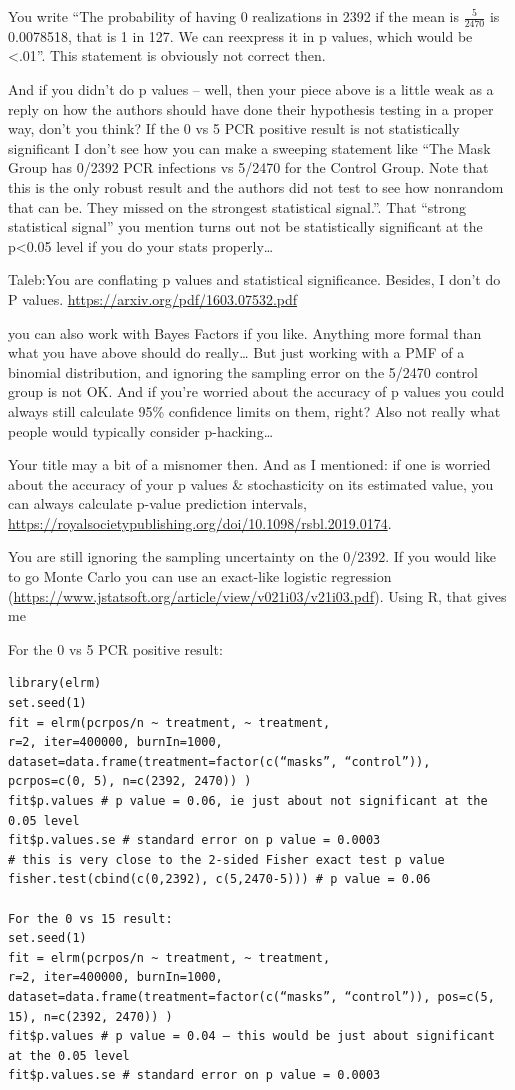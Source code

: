 \documentclass[
]{book}
\begin{document}
You write ``The probability of having 0 realizations in 2392
if the mean is \(\frac{5}{2470}\) is 0.0078518, that is 1 in 127.
We can reexpress it in p values, which would be \textless.01''.
This statement is obviously not correct then.

And if you didn't do p values -- well, then your piece above is a little weak as a reply on how the authors should have done their hypothesis testing in a proper way, don't you think? If the 0 vs 5 PCR positive result is not statistically significant I don't see how you can make a sweeping statement like ``The Mask Group has 0/2392 PCR infections vs 5/2470 for the Control Group. Note that this is the only robust result and the authors did not test to see how nonrandom that can be. They missed on the strongest statistical signal.''. That ``strong statistical signal'' you mention turns out not be statistically significant at the p\textless0.05 level if you do your stats properly\ldots{}

Taleb:You are conflating p values and statistical significance.
Besides, I don't do P values. \url{https://arxiv.org/pdf/1603.07532.pdf}

you can also work with Bayes Factors if you like. Anything more formal than what you have above should do really\ldots{} But just working with a PMF of a binomial distribution, and ignoring the sampling error on the 5/2470 control group is not OK. And if you're worried about the accuracy of p values you could always still calculate 95\% confidence limits on them, right? Also not really what people would typically consider p-hacking\ldots{}

Your title may a bit of a misnomer then. And as I mentioned: if one is worried about the accuracy of your p values \& stochasticity on its estimated value, you can always calculate p-value prediction intervals, \url{https://royalsocietypublishing.org/doi/10.1098/rsbl.2019.0174}.

You are still ignoring the sampling uncertainty on the 0/2392. If you would like to go Monte Carlo you can use an exact-like logistic regression (\url{https://www.jstatsoft.org/article/view/v021i03/v21i03.pdf}). Using R, that gives me

For the 0 vs 5 PCR positive result:

\begin{verbatim}
library(elrm)
set.seed(1)
fit = elrm(pcrpos/n ~ treatment, ~ treatment,
r=2, iter=400000, burnIn=1000,
dataset=data.frame(treatment=factor(c(“masks”, “control”)), pcrpos=c(0, 5), n=c(2392, 2470)) )
fit$p.values # p value = 0.06, ie just about not significant at the 0.05 level
fit$p.values.se # standard error on p value = 0.0003
# this is very close to the 2-sided Fisher exact test p value
fisher.test(cbind(c(0,2392), c(5,2470-5))) # p value = 0.06

For the 0 vs 15 result:
set.seed(1)
fit = elrm(pcrpos/n ~ treatment, ~ treatment,
r=2, iter=400000, burnIn=1000,
dataset=data.frame(treatment=factor(c(“masks”, “control”)), pos=c(5, 15), n=c(2392, 2470)) )
fit$p.values # p value = 0.04 – this would be just about significant at the 0.05 level
fit$p.values.se # standard error on p value = 0.0003
\end{verbatim}
\end{document}
